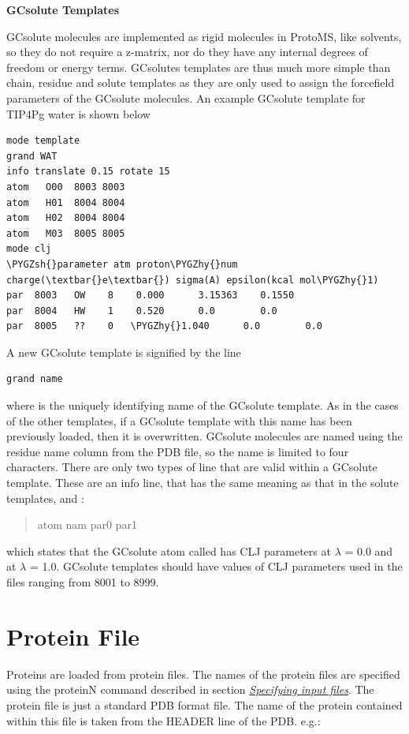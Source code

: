 \documentclass[letterpaper,10pt,english]{sphinxmanual}
\def\PYGZsh{\char`\#}
\def\PYGZhy{\char`\-}
\begin{document}
\textbf{GCsolute Templates}

GCsolute molecules are implemented as rigid molecules in ProtoMS, like solvents, so they do not require a z-matrix, nor do they have any internal degrees of freedom or energy terms. GCsolutes templates are thus much more simple than chain, residue and solute templates as they are only used to assign the forcefield parameters of the GCsolute molecules. An example GCsolute template for TIP4Pg water is shown below

\begin{Verbatim}[frame=single,commandchars=\\\{\}]
mode template
grand WAT
info translate 0.15 rotate 15
atom   O00  8003 8003
atom   H01  8004 8004
atom   H02  8004 8004
atom   M03  8005 8005
mode clj
\PYGZsh{}parameter atm proton\PYGZhy{}num charge(\textbar{}e\textbar{}) sigma(A) epsilon(kcal mol\PYGZhy{}1)
par  8003   OW    8    0.000      3.15363    0.1550
par  8004   HW    1    0.520      0.0        0.0
par  8005   ??    0   \PYGZhy{}1.040      0.0        0.0
\end{Verbatim}

A new GCsolute template is signified by the line

\begin{Verbatim}[frame=single,commandchars=\\\{\}]
grand name
\end{Verbatim}

where  is the uniquely identifying name of the GCsolute template. As in the cases of the other templates, if a GCsolute template with this name has been previously loaded, then it is overwritten. GCsolute molecules are named using the residue name column from the PDB file, so the name is limited to four characters. There are only two types of line that are valid within a GCsolute template. These are an info line, that has the same meaning as that in the solute templates, and :
\begin{quote}

atom nam par0 par1
\end{quote}

which states that the GCsolute atom called  has CLJ parameters  at \(\lambda\)  = 0.0 and  at \(\lambda\) = 1.0. GCsolute templates should have values of CLJ parameters used in the files ranging from 8001 to 8999.


\section{Protein File}
\label{protoms:protein-file}\label{protoms:protpdb}
Proteins are loaded from protein files. The names of the protein files are specified using the proteinN command described in section {\hyperref[protoms:incmd]{\emph{Specifying input files}}}. The protein file is just a standard PDB format file. The name of the protein contained within this file is taken from the HEADER line of the PDB. e.g.:
\end{document}
